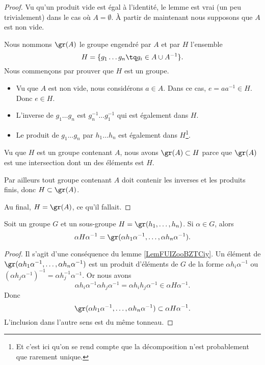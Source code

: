 \begin{proof}
    Vu qu'un produit vide est égal à l'identité, le lemme est vrai (un peu trivialement) dans le cas où \( A=\emptyset\). À partir de maintenant nous supposons que \( A\) est non vide.

    Nous nommons \( \gr(A)\) le groupe engendré par \( A\) et par \( H\) l'ensemble
    \begin{equation}
        H=\{ g_1\ldots g_n\tq g_i\in A\cup A^{-1} \}.
    \end{equation}
    Nous commençons par prouver que \( H\) est un groupe.
    \begin{itemize}
        \item Vu que \( A\) est non vide, nous considérons \( a\in A\). Dans ce cas, \( e=aa^{-1}\in H\). Donc \( e\in H\).
        \item L'inverse de \( g_1\ldots g_n\) est \( g_n^{-1}\ldots g_1^{-1}\) qui est également dans \( H\).
        \item Le produit de \( g_1\ldots g_n\) par \( h_1\ldots h_n\) est également dans \( H\)\footnote{Et c'est ici qu'on se rend compte que la décomposition n'est probablement que rarement unique.}.
    \end{itemize}
    Vu que \( H\) est un groupe contenant \( A\), nous avons \( \gr(A)\subset H\) parce que \( \gr(A)\) est une intersection dont un des éléments est \( H\).

    Par ailleurs tout groupe contenant \( A\) doit contenir les inverses et les produits finis, donc \( H\subset \gr(A)\).

    Au final, \( H=\gr(A)\), ce qu'il fallait.
\end{proof}

\begin{lemma}       \label{LEMooCFTVooKvmyKN}
    Soit un groupe \( G\) et un sous-groupe \( H=\gr(h_1,\ldots, h_n)\). Si \( \alpha\in G\), alors
    \begin{equation}
        \alpha H\alpha^{-1}=\gr(\alpha h_1\alpha^{-1},\ldots, \alpha h_n\alpha^{-1}).
    \end{equation}
\end{lemma}

\begin{proof}
    Il s'agit d'une conséquence du lemme \ref{LemFUIZooBZTCiy}. Un élément de \( \gr(\alpha h_1\alpha^{-1},\ldots, \alpha h_n\alpha^{-1})\) est un produit d'éléments de \( G\) de la forme \( \alpha h_i\alpha^{-1}\) ou \( (\alpha h_j\alpha^{-1})^{-1}=\alpha h_j^{-1}\alpha^{-1}\). Or nous avons
    \begin{equation}
        \alpha h_i\alpha^{-1}\alpha h_j\alpha^{-1}=\alpha h_ih_j\alpha^{-1}\in \alpha H\alpha^{-1}.
    \end{equation}
    Donc 
    \begin{equation}
        \gr(\alpha h_1\alpha^{-1},\ldots, \alpha h_n\alpha^{-1})\subset \alpha H\alpha^{-1}.
    \end{equation}
    L'inclusion dans l'autre sens est du même tonneau.
\end{proof}

